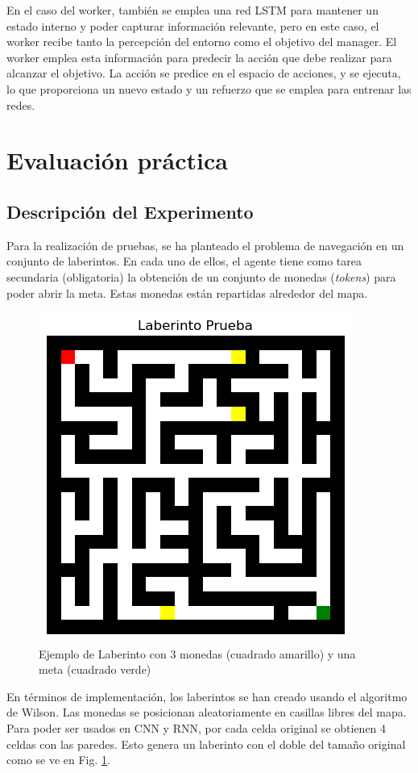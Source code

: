 \documentclass[letterpaper]{article} %
\begin{document}
En el caso del worker, también se emplea una red LSTM para mantener un estado interno y poder capturar información relevante,
pero en este caso, el worker recibe tanto la percepción del entorno como el objetivo del manager. El worker emplea esta información
para predecir la acción que debe realizar para alcanzar el objetivo. La acción se predice en el espacio de acciones, y se ejecuta,
lo que proporciona un nuevo estado y un refuerzo que se emplea para entrenar las redes.

\section{Evaluación práctica}
\subsection{Descripción del Experimento}

Para la realización de pruebas, se ha planteado el problema de navegación en un conjunto de laberintos. 
En cada uno de ellos, el agente tiene como tarea secundaria (obligatoria) la obtención de un conjunto de 
monedas (\textit{tokens}) para poder abrir la meta. Estas monedas están repartidas alrededor del mapa.

\begin{figure}[H]
    \centering
    \includegraphics[width=0.7\columnwidth]{maze.png}
    \caption{Ejemplo de Laberinto con 3 monedas (cuadrado amarillo) y una meta (cuadrado verde)\label{fig:maze-example}}
\end{figure}

En términos de implementación, los laberintos se han creado usando el algoritmo de Wilson. Las monedas se posicionan
aleatoriamente en casillas libres del mapa. Para poder ser usados en CNN y RNN, por cada celda original se obtienen 4 celdas con las paredes.
Esto genera un laberinto con el doble del tamaño original como se ve en Fig. \ref{fig:maze-example}.
\end{document}
